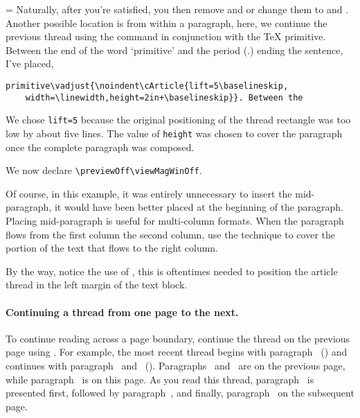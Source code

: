 \documentclass{article}
\begin{document}
\begin{center}\previewOn\viewMagWinOn
\begin{minipage}{.8\linewidth}\parindent=\amtIndent\relax
\newtopic\pii Naturally, after you're satisfied, you then remove
 and  or change them to
 and . Another possible location is from within
a paragraph, here, we continue the previous thread using the  command
in conjunction with the  {\TeX} primitive.
Between the end of the word `primitive' and the period (.) ending the sentence, I've placed,
\begin{Verbatim}[fontsize=\small]
primitive\vadjust{\noindent\cArticle{lift=5\baselineskip,
    width=\linewidth,height=2in+\baselineskip}}. Between the
\end{Verbatim}
We chose \texttt{lift=5\string\baselineskip} because the
original positioning of the thread rectangle was too low by about five lines.
The value of \texttt{height} was chosen to cover the paragraph once the
complete paragraph was composed.
\end{minipage}
\end{center}

\previewOff\viewMagWinOff
\begin{center}
\begin{minipage}{.8\linewidth}\parindent=20pt\relax
We now declare \verb|\previewOff\viewMagWinOff|.

\noindent\piii{}\indent
Of course, in this example, it was entirely unnecessary to insert the
 mid-paragraph, it would have been better placed at the
beginning of the paragraph. Placing  mid-paragraph is useful for
multi-column formats. When the paragraph flows from the first column the
second column, use the  technique to cover the portion of the
text that flows to the right column.
\end{minipage}
\end{center}
By the way, notice the use of , this is
oftentimes needed to position the article thread in the left margin of the
text block.

\paragraph*{Continuing a thread from one page to the next.} To continue
reading across a page boundary, continue the thread on the previous page
using . For example, the most recent thread begins with
paragraph~ () and continues with paragraph~
and~ (). Paragraphs~ and~ are on
the previous page, while paragraph~ is on this page. As you read
this thread, paragraph~ is presented first, followed by
paragraph~, and finally, paragraph~ on the subsequent
page.
\end{document}
